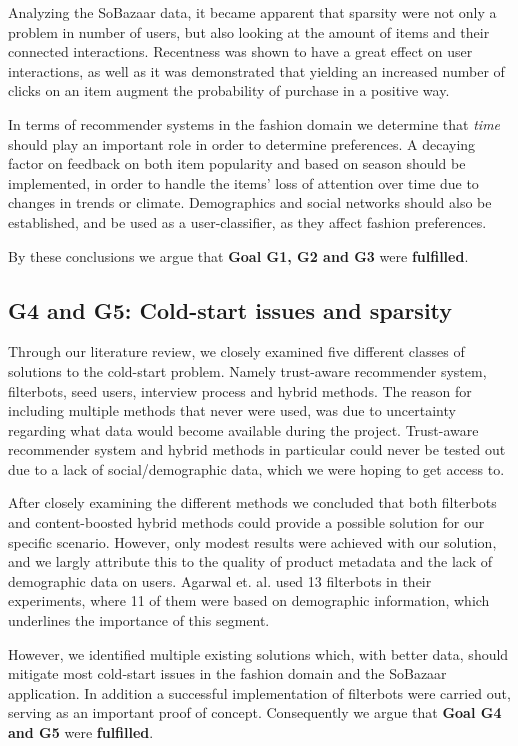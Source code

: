Analyzing the SoBazaar data, it became apparent that sparsity were not only a
problem in number of users, but also looking at the amount of items and their
connected interactions. Recentness was shown to have a great effect on user
interactions, as well as it was demonstrated that yielding an increased number
of clicks on an item augment the probability of purchase in a positive way.

In terms of recommender systems in the fashion domain we determine that
\textit{time} should play an important role in order to determine preferences.
A decaying factor on feedback on both item popularity and based on season
should be implemented, in order to handle the items' loss of attention over
time due to changes in trends or climate. Demographics and social networks
should also be established, and be used as a user-classifier, as they affect
fashion preferences.

By these conclusions we argue that \textbf{Goal G1, G2 and G3} were
\textbf{fulfilled}.

\subsection{G4 and G5: Cold-start issues and sparsity}
\label{sec:cold-start-conclusion-discussion}

Through our literature review, we closely examined five different classes of
solutions to the cold-start problem. Namely trust-aware recommender system,
filterbots, seed users, interview process and hybrid methods. The reason for
including multiple methods that never were used, was due to uncertainty
regarding what data would become available during the project. Trust-aware
recommender system and hybrid methods in particular could never be tested out
due to a lack of social/demographic data, which we were hoping to get access
to.

After closely examining the different methods we concluded that both filterbots
and content-boosted hybrid methods could provide a possible solution for our
specific scenario. However, only modest results were achieved with our
solution, and we largly attribute this to the quality of product metadata and
the lack of demographic data on users. Agarwal et. al. \cite{Agarwal2009} used
13 filterbots in their experiments, where 11 of them were based on demographic
information, which underlines the importance of this segment.

However, we identified multiple existing solutions which, with better data,
should mitigate most cold-start issues in the fashion domain and the SoBazaar
application. In addition a successful implementation of filterbots were carried
out, serving as an important proof of concept. Consequently we argue that
\textbf{Goal G4 and G5} were \textbf{fulfilled}.

